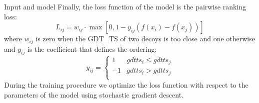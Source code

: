 \documentclass[final, unknownkeysallowed]{beamer}
\begin{document}
\begin{frame}{}
\begin{textblock}{39.0}
\begin{block}{Input and model}
Finally, the loss function of the model is the pairwise ranking loss:
$$ L_{ij} = w_{ij} \cdot \max \left[ 0, 1 - y_{ij} \left( f \left( x_i \right) - f \left( x_j \right) \right) \right] $$
where $w_{ij}$ is zero when the GDT\_TS of two decoys is too close and one otherwise and $y_{ij}$ is the coefficient that defines the ordering:
$$
y_{ij} = \begin{cases}
               1& gdtts_i \leq gdtts_j \\
               -1& gdtts_i > gdtts_j \\
            \end{cases}
$$
During the training procedure we optimize the loss function with respect to the parameters of the model using stochastic 
gradient descent.

\end{block}


\end{textblock}
\end{frame}
\end{document}
